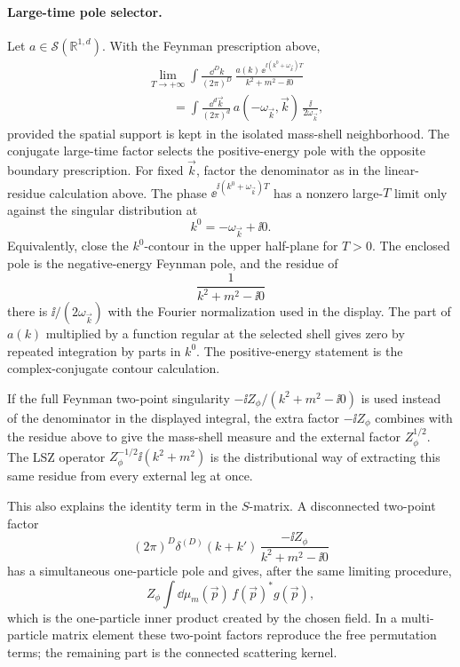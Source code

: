 \paragraph{Large-time pole selector.}
Let \(a\in\mathcal S(\mathbb R^{1,d})\).  With the Feynman prescription above,
\[
\begin{aligned}
&\lim_{T\to+\infty}
\int\frac{\dd^Dk}{(2\pi)^D}\,
\frac{a(k)\,\ee^{\ii(k^0+\omega_{\vec k})T}}
     {k^2+m^2-\ii0}
\\
&\qquad =
\int\frac{\dd^d\vec k}{(2\pi)^d}\,
a(-\omega_{\vec k},\vec k)\,
\frac{\ii}{2\omega_{\vec k}},
\end{aligned}
\]
provided the spatial support is kept in the isolated mass-shell neighborhood.
The conjugate large-time factor selects the positive-energy pole with the
opposite boundary prescription.
For fixed \(\vec k\), factor the denominator as in the linear-residue
calculation above.  The phase
\(\ee^{\ii(k^0+\omega_{\vec k})T}\) has a nonzero large-\(T\) limit only
against the singular distribution at
\[
  k^0=-\omega_{\vec k}+\ii0 .
\]
Equivalently, close the \(k^0\)-contour in the upper half-plane for \(T>0\).
The enclosed pole is the negative-energy Feynman pole, and the residue of
\[
  \frac{1}{k^2+m^2-\ii0}
\]
there is \(\ii/(2\omega_{\vec k})\) with the Fourier normalization used in the
display.  The part of \(a(k)\) multiplied by a function regular at the selected
shell gives zero by repeated integration by parts in \(k^0\).  The
positive-energy statement is the complex-conjugate contour calculation.

If the full Feynman two-point singularity
\(-\ii Z_\phi/(k^2+m^2-\ii0)\) is used instead of the denominator in the
displayed integral, the extra factor \(-\ii Z_\phi\) combines with the residue above
to give the mass-shell measure and the external factor \(Z_\phi^{1/2}\).  The LSZ
operator \(Z_\phi^{-1/2}\ii(k^2+m^2)\) is the distributional way of extracting this
same residue from every external leg at once.

This also explains the identity term in the \(S\)-matrix.  A disconnected
two-point factor
\[
  (2\pi)^D\delta^{(D)}(k+k')\,
  \frac{-\ii Z_\phi}{k^2+m^2-\ii0}
\]
has a simultaneous one-particle pole and gives, after the same limiting
procedure,
\[
  Z_\phi\int\dd\mu_m(\vec p)\,f(\vec p)^*g(\vec p),
\]
which is the one-particle inner product created by the chosen field.  In a
multi-particle matrix element these two-point factors reproduce the free
permutation terms; the remaining part is the connected scattering kernel.

